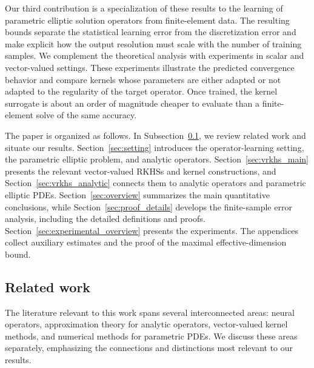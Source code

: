 \documentclass[11pt]{article}
\numberwithin{equation}{section}
\theoremstyle{plain}
\theoremstyle{definition}
\theoremstyle{remark}
\begin{document}
Our third contribution is a specialization of these results to the learning
of parametric elliptic solution operators from finite-element data. The
resulting bounds separate the statistical learning error from the
discretization error and make explicit how the output resolution must scale
with the number of training samples. We complement the theoretical analysis
with experiments in scalar and vector-valued settings. These experiments
illustrate the predicted convergence behavior and compare kernels whose
parameters are either adapted or not adapted to the regularity of the target
operator. Once trained, the kernel surrogate is about an order of magnitude
cheaper to evaluate than a finite-element solve of the same accuracy.

The paper is organized as follows. In
Subsection~\ref{subsec:related_work}, we review related work and situate
our results. Section~\ref{sec:setting} introduces the operator-learning
setting, the parametric elliptic problem, and analytic operators.
Section~\ref{sec:vrkhs_main} presents the relevant vector-valued RKHSs and
kernel constructions, and Section~\ref{sec:vrkhs_analytic} connects them
to analytic operators and parametric elliptic PDEs. Section~\ref{sec:overview} summarizes the main
quantitative conclusions, while Section~\ref{sec:proof_details} develops the
finite-sample error analysis, including the detailed definitions and proofs.
Section~\ref{sec:experimental_overview} presents the experiments. The
appendices collect auxiliary estimates and the proof of the maximal
effective-dimension bound.

\subsection{Related work}\label{subsec:related_work}

The literature relevant to this work spans several interconnected areas:
neural operators, approximation theory for analytic operators, vector-valued
kernel methods, and numerical methods for parametric PDEs. We discuss these
areas separately, emphasizing the connections and distinctions most relevant to
our results.
\end{document}
